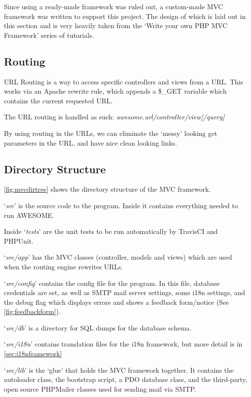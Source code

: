 	Since using a ready-made framework was ruled out, a custom-made \ac{MVC} framework was written to support this project.
	The design of which is laid out in this section and is very heavily taken from the `Write your own PHP MVC Framework' series of tutorials\cite{php-mvc-tutorial}.
	
	\subsection{Routing}
	
	URL Routing is a way to access specific controllers and views from a URL.
	This works via an Apache rewrite rule, which appends a \$\_GET variable which contains the current requested URL.
	
	The URL routing is handled as such: \textit{awesome.url/controller/view[/query]}
	
	By using routing in the URLs, we can eliminate the `messy' looking get parameters in the URL, and have nice clean looking links.
	
	\subsection{Directory Structure}
	
	\autoref{fig:mvcdirtree} shows the directory structure of the \ac{MVC} framework.
	
	`\textit{src}' is the source code to the program. Inside it contains everything needed to run \ac{AWESOME}.
	
	Inside `\textit{tests}' are the unit tests to be run automatically by TravisCI and PHPUnit.
	
	`\textit{src/app}' has the MVC classes (controller, models and views) which are used when the routing engine rewrites URLs.
	
	`\textit{src/config}' contains the config file for the program.
	In this file, database credentials are set, as well as SMTP mail server settings, some \ac{i18n} settings, and the debug flag which displays errors and shows a feedback form/notice (See \autoref{fig:feedbackform}).
	
	`\textit{src/db}' is a directory for \ac{SQL} dumps for the database schema.
	
	`\textit{src/i18n}' contains translation files for the \ac{i18n} framework, but more detail is in \autoref{sec:i18nframework}
	
	`\textit{src/lib}' is the `glue' that holds the MVC framework together.
	It contains the autoloader class, the bootstrap script, a \ac{PDO} database class, and the third-party, open source PHPMailer\cite{phpmailer} classes used for sending mail via SMTP.
	
